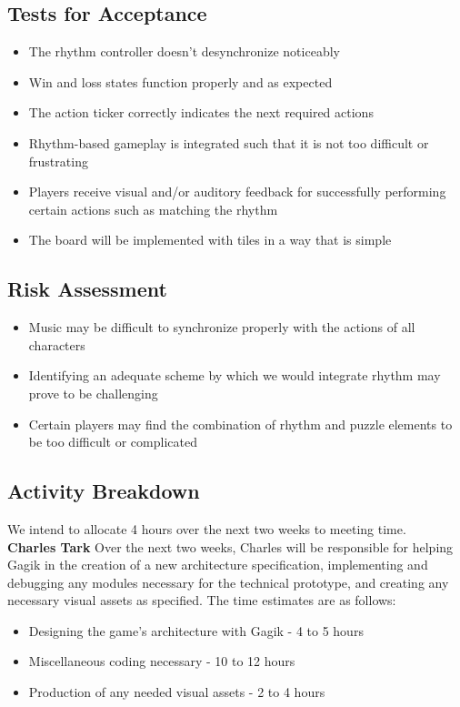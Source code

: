 \documentclass[]{article}
\begin{document}
\subsection*{Tests for Acceptance}
\begin{itemize}
\item The rhythm controller doesn't desynchronize noticeably
\item Win and loss states function properly and as expected
\item The action ticker correctly indicates the next required actions
\item Rhythm-based gameplay is integrated such that it is not too 
  difficult or frustrating
\item Players receive visual and/or auditory feedback for 
  successfully performing certain actions such as matching the rhythm
\item The board will be implemented with tiles in a way that is simple
\end{itemize}
\subsection*{Risk Assessment}
\begin{itemize}
\item Music may be difficult to synchronize properly with the 
  actions of all characters
\item Identifying an adequate scheme by which we would 
  integrate rhythm may prove to be challenging
\item Certain players may find the combination of rhythm and 
  puzzle elements to be too difficult or complicated
\end{itemize}
\subsection*{Activity Breakdown}

We intend to allocate 4 hours over the next two weeks to meeting time.\\

\noindent
\textbf{Charles Tark}
Over the next two weeks, Charles will be responsible for helping Gagik
in the creation of a new architecture specification, implementing and
debugging any modules necessary for the technical prototype, and
creating any necessary visual assets as specified.
The time estimates are as follows:
\begin{itemize}
  \item Designing the game's architecture with Gagik - 4 to 5 hours
  \item Miscellaneous coding necessary - 10 to 12 hours
  \item Production of any needed visual assets - 2 to 4 hours
\end{itemize}
\end{document}
